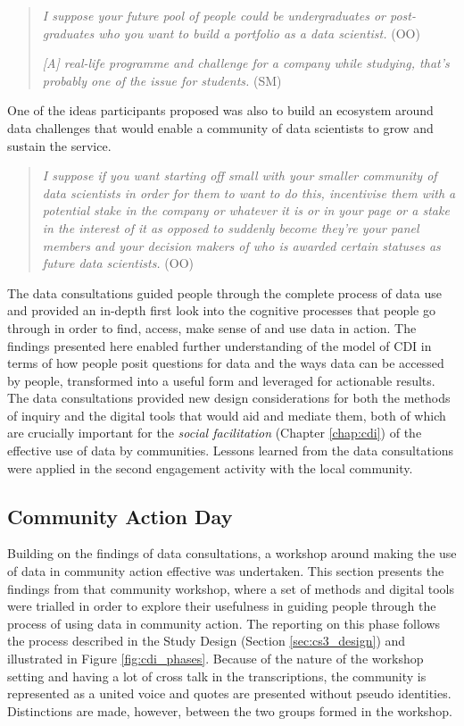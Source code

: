 \begin{quote}
    \textit{I suppose your future pool of people could be undergraduates or post-graduates who you want to build a portfolio as a data scientist.} (OO)

   \textit{[A] real-life programme and challenge for a company while studying, that's probably one of the issue for students.} (SM)
\end{quote}
One of the ideas participants proposed was also to build an ecosystem around data challenges that would enable a community of data scientists to grow and sustain the service.
\begin{quote}
    \textit{I suppose if you want starting off small with your smaller community of data scientists in order for them to want to do this, incentivise them with a potential stake in the company or whatever it is or in your page or a stake in the interest of it as opposed to suddenly become they're your panel members and your decision makers of who is awarded certain statuses as future data scientists.} (OO)
\end{quote}

The data consultations guided people through the complete process of data use and provided an in-depth first look into the cognitive processes that people go through in order to find, access, make sense of and use data in action. The findings presented here enabled further understanding of the model of CDI in terms of how people posit questions for data and the ways data can be accessed by people, transformed into a useful form and leveraged for actionable results. The data consultations provided new design considerations for both the methods of inquiry and the digital tools that would aid and mediate them, both of which are crucially important for the \textit{social facilitation} (Chapter \ref{chap:cdi}) of the effective use of data by communities. Lessons learned from the data consultations were applied in the second engagement activity with the local community.

\subsection{Community Action Day}
\label{subs:community_action}
Building on the findings of data consultations, a workshop around making the use of data in community action effective was undertaken. This section presents the findings from that community workshop, where a set of methods and digital tools were trialled in order to explore their usefulness in guiding people through the process of using data in community action. The reporting on this phase follows the process described in the Study Design (Section \ref{sec:cs3_design}) and illustrated in Figure \ref{fig:cdi_phases}. Because of the nature of the workshop setting and having a lot of cross talk in the transcriptions, the community is represented as a united voice and quotes are presented without pseudo identities. Distinctions are made, however, between the two groups formed in the workshop.

